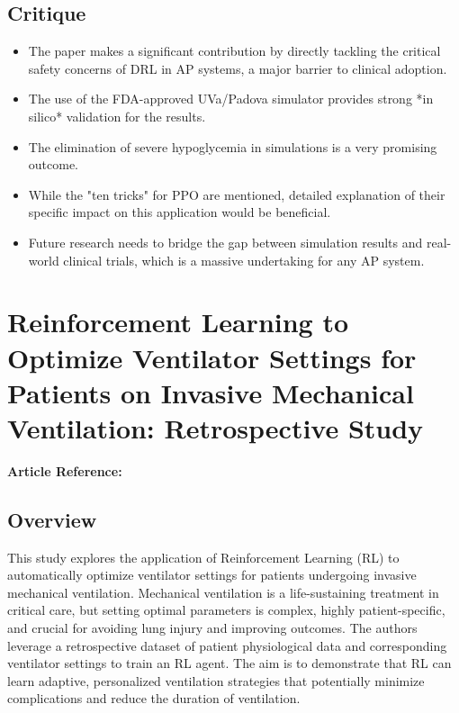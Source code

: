 \subsection*{Critique}
\begin{itemize}
    \item The paper makes a significant contribution by directly tackling the critical safety concerns of DRL in AP systems, a major barrier to clinical adoption.
    \item The use of the FDA-approved UVa/Padova simulator provides strong *in silico* validation for the results.
    \item The elimination of severe hypoglycemia in simulations is a very promising outcome.
    \item While the "ten tricks" for PPO are mentioned, detailed explanation of their specific impact on this application would be beneficial.
    \item Future research needs to bridge the gap between simulation results and real-world clinical trials, which is a massive undertaking for any AP system.
\end{itemize}
\section{Reinforcement Learning to Optimize Ventilator Settings for Patients on Invasive Mechanical Ventilation: Retrospective Study}
\textbf{Article Reference:} \cite{liuReinforcementLearningOptimize2024}

\subsection*{Overview}
This study explores the application of Reinforcement Learning (RL) to automatically optimize ventilator settings for patients undergoing invasive mechanical ventilation. Mechanical ventilation is a life-sustaining treatment in critical care, but setting optimal parameters is complex, highly patient-specific, and crucial for avoiding lung injury and improving outcomes. The authors leverage a retrospective dataset of patient physiological data and corresponding ventilator settings to train an RL agent. The aim is to demonstrate that RL can learn adaptive, personalized ventilation strategies that potentially minimize complications and reduce the duration of ventilation.

